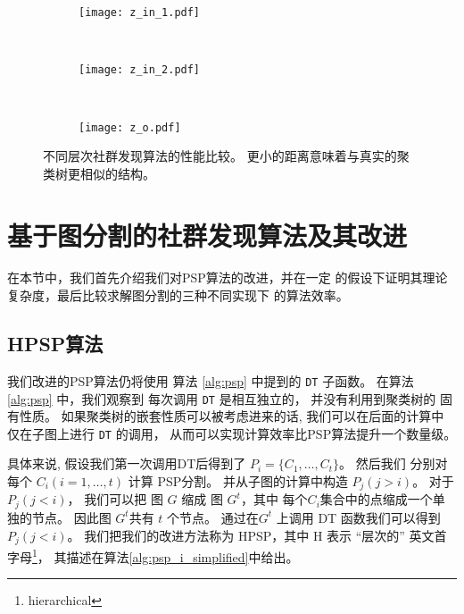 \begin{figure}
	\centering
	\begin{subfigure}{0.33\textwidth}
		\texttt{[image: z\_in\_1.pdf]}
		\caption{}
	\end{subfigure}~
	\begin{subfigure}{0.33\textwidth}
		\texttt{[image: z\_in\_2.pdf]}
		\caption{}
	\end{subfigure}~
	\begin{subfigure}{0.33\textwidth}
		\texttt{[image: z\_o.pdf]}
		\caption{}
	\end{subfigure}
	\caption{不同层次社群发现算法的性能比较。
  更小的距离意味着与真实的聚类树更相似的结构。
  }\label{fig:cdr}	
\end{figure}

\section{基于图分割的社群发现算法及其改进}
在本节中，我们首先介绍我们对PSP算法的改进，并在一定
的假设下证明其理论复杂度，最后比较求解图分割的三种不同实现下
的算法效率。
\subsection{HPSP算法}
我们改进的PSP算法仍将使用
算法 \ref{alg:psp} 中提到的
\texttt{DT} 子函数。
在算法\ref{alg:psp} 中，我们观察到
每次调用 \texttt{DT} 是相互独立的，
并没有利用到聚类树的 固有性质。
如果聚类树的嵌套性质可以被考虑进来的话, 
我们可以在后面的计算中
仅在子图上进行 \texttt{DT} 的调用，
从而可以实现计算效率比PSP算法提升一个数量级。


具体来说,
假设我们第一次调用DT后得到了
$P_i = \{C_1, \dots, C_t\}$。
然后我们 分别对每个
$C_i(i=1,\dots, t)$
计算 PSP分割。
并从子图的计算中构造 $P_j(j>i)$。
对于 $P_j(j<i)$，
我们可以把 图 $G$
缩成 图 $G^t$，其中 每个$C_i$集合中的点缩成一个单独的节点。
因此图 $G^t$共有 $t$ 个节点。
通过在$G^t$ 上调用 DT 函数我们可以得到  $P_j(j<i)$。
我们把我们的改进方法称为 HPSP，其中 H 表示 “层次的”
英文首字母\footnote{hierarchical}，
其描述在算法\ref{alg:psp_i_simplified}中给出。

